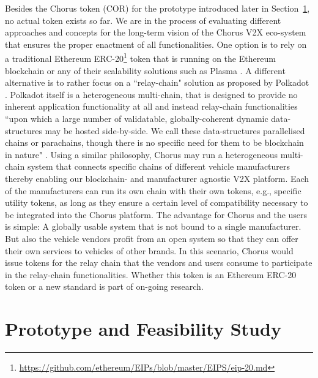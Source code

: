\documentclass{llncs}
\begin{document}
{			Besides the Chorus token (COR) for the prototype introduced later in Section~\ref{s:section-6}, no actual token exists so far. We are in the process of evaluating different approaches and concepts for the long-term vision of the Chorus V2X eco-system that ensures the proper enactment of all functionalities. One option is to rely on a traditional Ethereum ERC-20\footnote{\url{https://github.com/ethereum/EIPs/blob/master/EIPS/eip-20.md}} token that is running on the Ethereum blockchain or any of their scalability solutions such as Plasma \cite{plasmaWhitepaper}. A different alternative is to rather focus on a ``relay-chain" solution as proposed by Polkadot \cite{polkadotWhitepaper}. Polkadot itself is a heterogeneous multi-chain, that is designed to provide no inherent application functionality at all and instead relay-chain functionalities ``upon which a large number of validatable, globally-coherent dynamic data-structures may be hosted side-by-side. We call these data-structures parallelised chains or parachains, though there is no specific need for them to be blockchain in nature" \cite{polkadotWhitepaper}. Using a similar philosophy, Chorus may run a heterogeneous multi-chain system that connects specific chains of different vehicle manufacturers thereby enabling our blockchain- and manufacturer agnostic V2X platform. Each of the manufacturers can run its own chain with their own tokens, e.g., specific utility tokens, as long as they ensure a certain level of compatibility necessary to be integrated into the Chorus platform. The advantage for Chorus and the users is simple: A globally usable system that is not bound to a single manufacturer. But also the vehicle vendors profit from an open system so that they can offer their own services to vehicles of other brands. In this scenario, Chorus would issue tokens for the relay chain that the vendors and users consume to participate in the relay-chain functionalities. Whether this token is an Ethereum ERC-20 token or a new standard is part of on-going research.
			 
			



	\section{Prototype and Feasibility Study}
		\label{s:section-6}	
			
}
\end{document}
